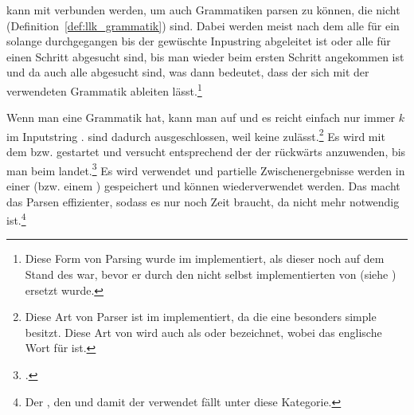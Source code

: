 \begin{Special_Paragraph}
\begin{itemize}[itemsep=-1mm, topsep=-1mm]
   kann mit  verbunden werden, um auch Grammatiken parsen zu können, die nicht  (Definition~\ref{def:llk_grammatik}) sind. Dabei werden meist nach dem  alle  für ein  solange durchgegangen bis der gewüschte Inpustring abgeleitet ist oder alle  für einen Schritt abgesucht sind, bis man wieder beim ersten Schritt angekommen ist und da auch alle  abgesucht sind, was dann bedeutet, dass der  sich  mit der verwendeten Grammatik ableiten lässt.\footnote{Diese Form von Parsing wurde im  implementiert, als dieser noch auf dem Stand des  war, bevor er durch den nicht selbst implementierten  von  (siehe \cite{noauthor_lark_2022}) ersetzt wurde.}

  Wenn man eine  Grammatik hat, kann man auf  und es reicht einfach nur immer $k$   im Inputstring .  sind dadurch ausgeschlossen, weil  keine  zulässt.\footnote{Diese Art von Parser ist im  implementiert, da die  eine besonders simple  besitzt. Diese Art von  wird auch als  oder  bezeichnet, wobei  das englische Wort für  ist.}
   Es wird mit dem  bzw.  gestartet und versucht  entsprechend der  der  rückwärts anzuwenden, bis man beim  landet.\footcite{noauthor_what_nodate-1}
   Es wird  verwendet und partielle Zwischenergebnisse werden in einer  (bzw. einem ) gespeichert und können wiederverwendet werden. Das macht das Parsen  effizienter, sodass es nur noch  Zeit braucht, da  nicht mehr notwendig ist.\footnote{Der , den  und damit der  verwendet fällt unter diese Kategorie.}
\end{itemize}
\end{Special_Paragraph}

